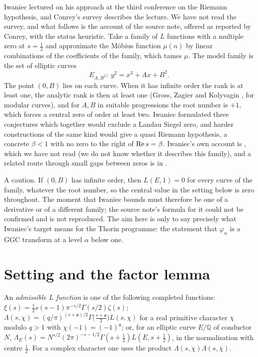 Iwaniec lectured on his approach at the third conference on the Riemann hypothesis, and Conrey's survey \cite{NCConrey03} describes the lecture. We have not read the survey, and what follows is the account of the source note, offered as reported by Conrey, with the status heuristic. Take a family of $L$ functions with a multiple zero at $s=\frac12$ and approximate the M\"obius function $\mu(n)$ by linear combinations of the coefficients of the family, which tames $\mu$. The model family is the set of elliptic curves
\[
E_{A,B^2}:\ y^2=x^3+Ax+B^2 .
\]
The point $(0,B)$ lies on each curve. When it has infinite order the rank is at least one, the analytic rank is then at least one (Gross, Zagier and Kolyvagin \cite{NCGrossZagier86,NCKolyvagin89}, for modular curves), and for $A,B$ in suitable progressions the root number is $+1$, which forces a central zero of order at least two. Iwaniec formulated three conjectures which together would exclude a Landau Siegel zero, and harder constructions of the same kind would give a quasi Riemann hypothesis, a concrete $\beta<1$ with no zero to the right of $\operatorname{Re} s=\beta$. Iwaniec's own account is \cite{NCIwaniecConv06}, which we have not read (we do not know whether it describes this family), and a related route through small gaps between zeros is in \cite{NCConreyIwaniec02}.

A caution. If $(0,B)$ has infinite order, then $L(E,1)=0$ for every curve of the family, whatever the root number, so the central value in the setting below is zero throughout. The moment that Iwaniec bounds must therefore be one of a derivative or of a different family; the source note's formula for it could not be confirmed and is not reproduced. The aim here is only to say precisely what Iwaniec's target means for the Thorin programme: the statement that $\varphi_\alpha$ is a GGC transform at a level $\alpha$ below one.

\section{Setting and the factor lemma}\label{iw:sec:setting}

\begin{definition}
An \emph{admissible $L$ function} is one of the following completed functions: $\xi(s)=\frac12s(s-1)\pi^{-s/2}\Gamma(s/2)\zeta(s)$; $\Lambda(s,\chi)=(q/\pi)^{(s+\mathfrak a)/2}\Gamma\big(\frac{s+\mathfrak a}{2}\big)L(s,\chi)$ for a real primitive character $\chi$ modulo $q>1$ with $\chi(-1)=(-1)^{\mathfrak a}$; or, for an elliptic curve $E/\mathbb Q$ of conductor $N$, $\Lambda_E(s)=N^{s/2}(2\pi)^{-s-1/2}\Gamma(s+\frac12)L(E,s+\frac12)$, in the normalisation with centre $\frac12$. For a complex character one uses the product $\Lambda(s,\chi)\Lambda(s,\bar\chi)$.
\end{definition}

